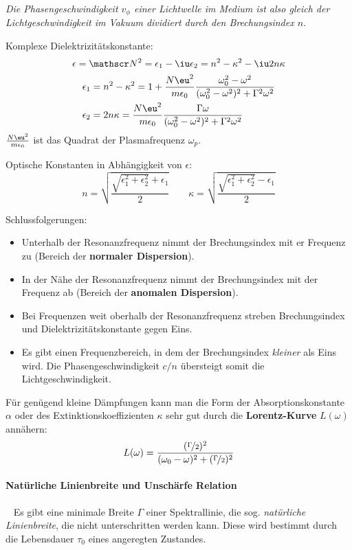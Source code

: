 		\emph{Die Phasengeschwindigkeit $v_\phi$ einer Lichtwelle im Medium ist also gleich der Lichtgeschwindigkeit im Vakuum dividiert durch den Brechungsindex $n$.}
		
		Komplexe Dielektrizitätskonstante:
		\[
			\epsilon = \mathscr N^2 = \epsilon_1 - \iu \epsilon_2 = n^2 - \kappa^2 - \iu 2 n\kappa
		\]
		\begin{align*}
			\epsilon_1 &= n^2 - \kappa^2 = 1 + \frac{N \eu^2}{m\epsilon_0} \frac{\omega_0^2 - \omega^2}{(\omega_0^2 - \omega^2)^2 + \Gamma^2 \omega^2} \\
			\epsilon_2 &= 2n\kappa = \frac{N \eu^2}{m\epsilon_0} \frac{\Gamma \omega}{(\omega_0^2 - \omega^2)^2 + \Gamma^2 \omega^2}
		\end{align*}
		$\frac{N \eu^2}{m\epsilon_0}$ ist das Quadrat der Plasmafrequenz $\omega_p$.
		
		Optische Konstanten in Abhängigkeit von $\epsilon$:
		\begin{equation*}
			n = \sqrt{\frac{\sqrt{\epsilon_1^2 + \epsilon_2^2}+\epsilon_1}{2}} \qquad
			\kappa = \sqrt{\frac{\sqrt{\epsilon_1^2 + \epsilon_2^2}-\epsilon_1}{2}}
		\end{equation*}
		
		Schlussfolgerungen:
		\begin{itemize}
			\item Unterhalb der Resonanzfrequenz nimmt der Brechungsindex mit er Frequenz zu (Bereich der \textbf{normaler Dispersion}).
			\item In der Nähe der Resonanzfrequenz nimmt der Brechungsindex mit der Frequenz ab (Bereich der \textbf{anomalen Dispersion}).
			\item Bei Frequenzen weit oberhalb der Resonanzfrequenz streben Brechungsindex und Dielektrizitätskonstante gegen Eins.
			\item Es gibt einen Frequenzbereich, in dem der Brechungsindex \emph{kleiner} als Eins wird. Die Phasengeschwindigkeit $c/n$ übersteigt somit die Lichtgeschwindigkeit.
		\end{itemize}
		
		Für genügend kleine Dämpfungen kann man die Form der Absorptionskonstante $\alpha$ oder des Extinktionskoeffizienten $\kappa$ sehr gut durch die \textbf{Lorentz-Kurve} $L(\omega)$ annähern:
		\[
			L(\omega) = \frac{(\nicefrac \Gamma 2)^2}{(\omega_0 - \omega)^2 + (\nicefrac \Gamma 2)^2}
		\]
		
		\paragraph{Natürliche Linienbreite und Unschärfe Relation} %
			~
			Es gibt eine minimale Breite $\Gamma$ einer Spektrallinie, die sog.
			\emph{natürliche Linienbreite}, die nicht unterschritten werden kann. Diese wird bestimmt durch die Lebensdauer $\tau_0$ eines angeregten Zustandes.
			
